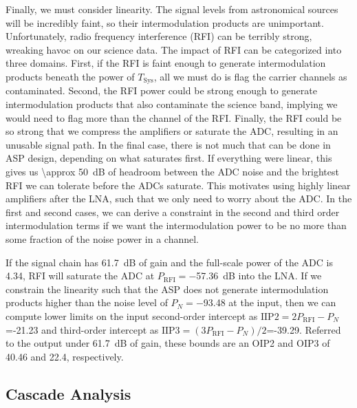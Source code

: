 Finally, we must consider linearity.
The signal levels from astronomical sources will be incredibly faint, so their intermodulation products are unimportant.
Unfortunately, radio frequency interference (RFI) can be terribly strong, wreaking havoc on our science data.
The impact of RFI can be categorized into three domains.
First, if the RFI is faint enough to generate intermodulation products beneath the power of $T_\text{Sys}$, all we must do is flag the carrier channels as contaminated.
Second, the RFI power could be strong enough to generate intermodulation products that also contaminate the science band, implying we would need to flag more than the channel of the RFI.
Finally, the RFI could be so strong that we compress the amplifiers or saturate the ADC, resulting in an unusable signal path.
In the final case, there is not much that can be done in ASP design, depending on what saturates first.
If everything were linear, this gives us \qty{\approx 50}{\dB} of headroom between the ADC noise and the brightest RFI we can tolerate before the ADCs saturate.
This motivates using highly linear amplifiers after the LNA, such that we only need to worry about the ADC.
In the first and second cases, we can derive a constraint in the second and third order intermodulation terms if we want the intermodulation power to be no more than some fraction of the noise power in a channel.

If the signal chain has \qty{61.7}{\dB} of gain and the full-scale power of the ADC is \qty{4.34}{\dBm}, RFI will saturate the ADC at $P_\text{RFI}=$\qty{-57.36}{\dB} into the LNA.
If we constrain the linearity such that the ASP does not generate intermodulation products higher than the noise level of $P_N=$\qty{-93.48}{\dBm} at the input, then we can compute lower limits on the input second-order intercept as $\text{IIP2} = 2P_\text{RFI} - P_N$\qty{=-21.23}{\dBm} and third-order intercept as $\text{IIP3} = (3P_\text{RFI} - P_N)/2$\qty{=-39.29}{\dBm}.
Referred to the output under \qty{61.7}{\dB} of gain, these bounds are an OIP2 and OIP3 of \qty{40.46}{\dBm} and \qty{22.4}{\dBm}, respectively.

\subsection{Cascade Analysis}

